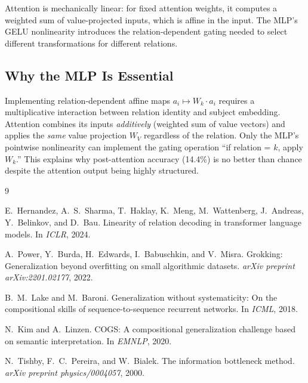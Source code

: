 \documentclass[11pt]{article}
\begin{document}
Attention is mechanically linear: for fixed attention weights, it computes a weighted
sum of value-projected inputs, which is affine in the input. The MLP's GELU
nonlinearity introduces the relation-dependent gating needed to select different
transformations for different relations.

\subsection{Why the MLP Is Essential}

Implementing relation-dependent affine maps $a_i \mapsto W_k \cdot a_i$ requires a
multiplicative interaction between relation identity and subject embedding. Attention
combines its inputs \emph{additively} (weighted sum of value vectors) and applies the
\emph{same} value projection $W_V$ regardless of the relation. Only the MLP's
pointwise nonlinearity can implement the gating operation ``if relation = $k$, apply
$W_k$.'' This explains why post-attention accuracy (14.4\%) is no better than chance
despite the attention output being highly structured.

\begin{thebibliography}{9}

E.~Hernandez, A.~S.~Sharma, T.~Haklay, K.~Meng, M.~Wattenberg, J.~Andreas,
Y.~Belinkov, and D.~Bau.
\newblock Linearity of relation decoding in transformer language models.
\newblock In \emph{ICLR}, 2024.

A.~Power, Y.~Burda, H.~Edwards, I.~Babuschkin, and V.~Misra.
\newblock Grokking: Generalization beyond overfitting on small algorithmic datasets.
\newblock \emph{arXiv preprint arXiv:2201.02177}, 2022.

B.~M.~Lake and M.~Baroni.
\newblock Generalization without systematicity: On the compositional skills of
  sequence-to-sequence recurrent networks.
\newblock In \emph{ICML}, 2018.

N.~Kim and A.~Linzen.
\newblock COGS: A compositional generalization challenge based on semantic
  interpretation.
\newblock In \emph{EMNLP}, 2020.

N.~Tishby, F.~C.~Pereira, and W.~Bialek.
\newblock The information bottleneck method.
\newblock \emph{arXiv preprint physics/0004057}, 2000.

\end{thebibliography}
\end{document}
